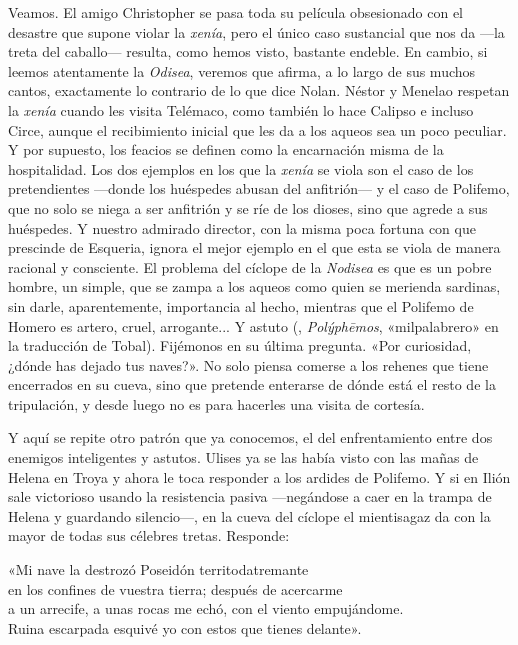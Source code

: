 Veamos. El amigo Christopher se pasa toda su película obsesionado con el desastre que supone violar la \emph{xenía}, pero el único caso sustancial que nos da ---la treta del caballo--- resulta, como hemos visto, bastante endeble. En cambio, si leemos atentamente la \emph{Odisea}, veremos que afirma, a lo largo de sus muchos cantos, exactamente lo contrario de lo que dice Nolan. Néstor y Menelao respetan la \emph{xenía} cuando les visita Telémaco, como también lo hace Calipso e incluso Circe, aunque el recibimiento inicial que les da a los aqueos sea un poco peculiar. Y por supuesto, los feacios se definen como la encarnación misma de la hospitalidad. Los dos ejemplos en los que la \emph{xenía} se viola son el caso de los pretendientes ---donde los huéspedes abusan del anfitrión--- y el caso de Polifemo, que no solo se niega a ser anfitrión y se ríe de los dioses, sino que agrede a sus huéspedes. Y nuestro admirado director, con la misma poca fortuna con que prescinde de Esqueria, ignora el mejor ejemplo en el que esta se viola de manera racional y consciente. El problema del cíclope de la \emph{Nodisea} es que es un pobre hombre, un simple, que se zampa a los aqueos como quien se merienda sardinas, sin darle, aparentemente, importancia al hecho, mientras que el Polifemo de Homero es artero, cruel, arrogante... Y astuto (, \emph{Polýphēmos}, «milpalabrero» en la traducción de Tobal). Fijémonos en su última pregunta. «Por curiosidad, ¿dónde has dejado tus naves?». No solo piensa comerse a los rehenes que tiene encerrados en su cueva, sino que pretende enterarse de dónde está el resto de la tripulación, y desde luego no es para hacerles una visita de cortesía.

Y aquí se repite otro patrón que ya conocemos, el del enfrentamiento entre dos enemigos inteligentes y astutos. Ulises ya se las había visto con las mañas de Helena en Troya y ahora le toca responder a los ardides de Polifemo. Y si en Ilión sale victorioso usando la resistencia pasiva ---negándose a caer en la trampa de Helena y guardando silencio---, en la cueva del cíclope el mientisagaz da con la mayor de todas sus célebres tretas. Responde:

\begin{versocita}
«Mi nave la destrozó Poseidón territodatremante\\
en los confines de vuestra tierra; después de acercarme\\
a un arrecife, a unas rocas me echó, con el viento empujándome.\\
Ruina escarpada esquivé yo con estos que tienes delante».
\end{versocita}

